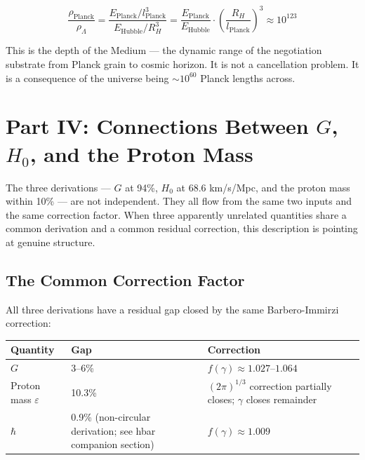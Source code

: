 \documentclass[11pt,letterpaper]{article}
\newenvironment{plainbox}{\begin{tcolorbox}[colback=blue!3!white,colframe=blue!40!white,title={\small\textit{In plain language}},breakable]}{\end{tcolorbox}}
\begin{document}
\begin{equation}
\frac{\rho_\text{Planck}}{\rho_\Lambda} = \frac{E_\text{Planck}/l_\text{Planck}^3}{E_\text{Hubble}/R_H^3} = \frac{E_\text{Planck}}{E_\text{Hubble}} \cdot \left(\frac{R_H}{l_\text{Planck}}\right)^3 \approx 10^{123}
\end{equation}

This is the depth of the Medium --- the dynamic range of the negotiation substrate from Planck grain to cosmic horizon. It is not a cancellation problem. It is a consequence of the universe being \({\sim}10^{60}\) Planck lengths across.

\section{Part IV: Connections Between \(G\), \(H_0\), and the Proton Mass}
\label{sec:org1ee0078}

\begin{plainbox}
The three derivations --- $G$ at 94\%, $H_0$ at 68.6 km/s/Mpc, and the proton mass within 10\% --- are not independent. They all flow from the same two inputs and the same correction factor. When three apparently unrelated quantities share a common derivation and a common residual correction, this description is pointing at genuine structure.
\end{plainbox}

\subsection{The Common Correction Factor}
\label{sec:org489adf6}

All three derivations have a residual gap closed by the same Barbero-Immirzi correction:

\begin{center}
\begin{tabular}{lll}
\toprule
\textbf{Quantity} & \textbf{Gap} & \textbf{Correction}\\[0pt]
\midrule
\(G\) & 3--6\% & \(f(\gamma) \approx 1.027\text{--}1.064\)\\[0pt]
Proton mass \(\varepsilon\) & 10.3\% & \((2\pi)^{1/3}\) correction partially closes; \(\gamma\) closes remainder\\[0pt]
\(\hbar\) & 0.9\% (non-circular derivation; see hbar companion section) & \(f(\gamma) \approx 1.009\)\\[0pt]
\bottomrule
\end{tabular}
\end{center}
\end{document}
